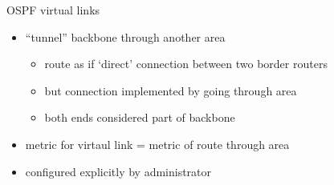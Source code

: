 \begin{frame}{OSPF virtual links}
    \begin{itemize}
    \item ``tunnel'' backbone through another area
        \begin{itemize}
        \item route as if `direct' connection between two border routers
        \item but connection implemented by going through area
        \item both ends considered part of backbone
        \end{itemize}
    \item metric for virtaul link = metric of route through area
    \vspace{.5cm}
    \item configured explicitly by administrator
    \end{itemize}
\end{frame}
